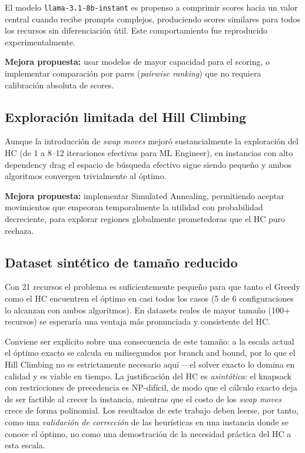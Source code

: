 \documentclass[11pt, a4paper]{article}
\begin{document}
El modelo \texttt{llama-3.1-8b-instant} es propenso a comprimir scores hacia un valor central cuando recibe prompts complejos, produciendo scores similares para todos los recursos sin diferenciación útil. Este comportamiento fue reproducido experimentalmente.

\begin{notebox}
\textbf{Mejora propuesta:} usar modelos de mayor capacidad para el scoring, o implementar comparación por pares (\emph{pairwise ranking}) que no requiera calibración absoluta de scores.
\end{notebox}

\subsection{Exploración limitada del Hill Climbing}

Aunque la introducción de \emph{swap moves} mejoró sustancialmente la exploración del HC (de 1 a 8–12 iteraciones efectivas para ML Engineer), en instancias con alto dependency drag el espacio de búsqueda efectivo sigue siendo pequeño y ambos algoritmos convergen trivialmente al óptimo.

\begin{notebox}
\textbf{Mejora propuesta:} implementar Simulated Annealing, permitiendo aceptar movimientos que empeoran temporalmente la utilidad con probabilidad decreciente, para explorar regiones globalmente prometedoras que el HC puro rechaza.
\end{notebox}

\subsection{Dataset sintético de tamaño reducido}

Con 21 recursos el problema es suficientemente pequeño para que tanto el Greedy como el HC encuentren el óptimo en casi todos los casos (5 de 6 configuraciones lo alcanzan con ambos algoritmos). En datasets reales de mayor tamaño (100+ recursos) se esperaría una ventaja más pronunciada y consistente del HC.

Conviene ser explícito sobre una consecuencia de este tamaño: a la escala actual el óptimo exacto se calcula en milisegundos por branch and bound, por lo que el Hill Climbing no es estrictamente necesario aquí —el solver exacto lo domina en calidad y es viable en tiempo. La justificación del HC es \emph{asintótica}: el knapsack con restricciones de precedencia es NP-difícil, de modo que el cálculo exacto deja de ser factible al crecer la instancia, mientras que el costo de los \emph{swap moves} crece de forma polinomial. Los resultados de este trabajo deben leerse, por tanto, como una \emph{validación de corrección} de las heurísticas en una instancia donde se conoce el óptimo, no como una demostración de la necesidad práctica del HC a esta escala.
\end{document}
